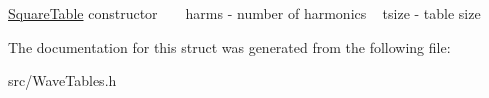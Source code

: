 \hyperlink{struct_square_table}{Square\+Table} constructor ~\newline
~\newline
harms -\/ number of harmonics ~\newline
tsize -\/ table size ~\newline


The documentation for this struct was generated from the following file\+:\begin{DoxyCompactItemize}
\item 
src/Wave\+Tables.\+h\end{DoxyCompactItemize}
